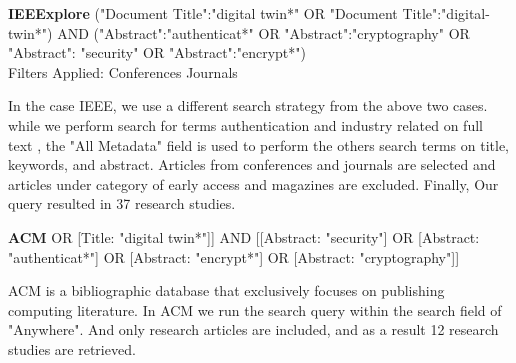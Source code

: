 \begin{tcolorbox}[colback=black!5!white, sharp corners=all, colframe=white!95!black]
\textbf{IEEExplore}
\tcblower
("Document Title":"digital twin*" OR "Document Title":"digital-twin*") AND ("Abstract":"authenticat*" OR "Abstract":"cryptography" OR "Abstract": "security" OR "Abstract":"encrypt*") \\

Filters Applied: Conferences Journals
\end{tcolorbox}
In the case IEEE, we use a different search strategy from the above two cases. while we perform search for terms  authentication and industry related on full text , the "All Metadata" field is used to perform the others search terms on title, keywords, and abstract. Articles from conferences and journals are selected and articles under category of early access and magazines are excluded. Finally, Our query resulted in 37 research studies.   

\begin{tcolorbox}[colback=black!5!white, sharp corners=all, colframe=white!95!black]
\textbf{ACM}
\tcblower
[[Title: "digital-twin*"] OR [Title: "digital twin*"]] AND [[Abstract: "security"] OR [Abstract: "authenticat*"] OR [Abstract: "encrypt*"] OR [Abstract: "cryptography"]]

\end{tcolorbox}
ACM is a bibliographic database that exclusively focuses on publishing computing literature. In ACM we run the search query within the search field of "Anywhere". And only research articles are included, and as a result 12 research studies are retrieved. 




